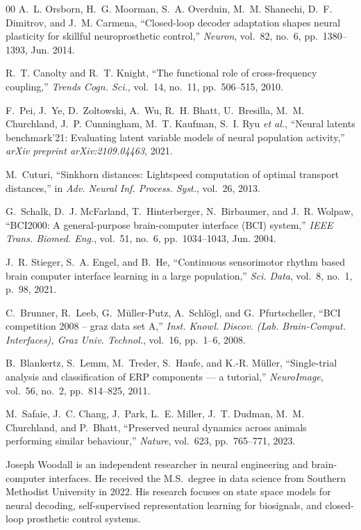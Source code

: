 \documentclass[journal]{IEEEtran}
\begin{document}
\begin{thebibliography}{00}
A.~L. Orsborn, H.~G. Moorman, S.~A. Overduin, M.~M. Shanechi, D.~F. Dimitrov, and J.~M. Carmena, ``Closed-loop decoder adaptation shapes neural plasticity for skillful neuroprosthetic control,'' \emph{Neuron}, vol.~82, no.~6, pp.~1380--1393, Jun. 2014.

R.~T. Canolty and R.~T. Knight, ``The functional role of cross-frequency coupling,'' \emph{Trends Cogn. Sci.}, vol.~14, no.~11, pp.~506--515, 2010.

F.~Pei, J.~Ye, D.~Zoltowski, A.~Wu, R.~H. Bhatt, U.~Bresilla, M.~M. Churchland, J.~P. Cunningham, M.~T. Kaufman, S.~I. Ryu \emph{et al.}, ``Neural latents benchmark'21: Evaluating latent variable models of neural population activity,'' \emph{arXiv preprint arXiv:2109.04463}, 2021.

M.~Cuturi, ``Sinkhorn distances: Lightspeed computation of optimal transport distances,'' in \emph{Adv. Neural Inf. Process. Syst.}, vol.~26, 2013.

G.~Schalk, D.~J. McFarland, T.~Hinterberger, N.~Birbaumer, and J.~R. Wolpaw, ``{BCI2000}: A general-purpose brain-computer interface ({BCI}) system,'' \emph{IEEE Trans. Biomed. Eng.}, vol.~51, no.~6, pp.~1034--1043, Jun. 2004.

J.~R. Stieger, S.~A. Engel, and B.~He, ``Continuous sensorimotor rhythm based brain computer interface learning in a large population,'' \emph{Sci. Data}, vol.~8, no.~1, p.~98, 2021.

C.~Brunner, R.~Leeb, G.~M\"{u}ller-Putz, A.~Schl\"{o}gl, and G.~Pfurtscheller, ``{BCI} competition 2008 -- graz data set {A},'' \emph{Inst. Knowl. Discov. (Lab. Brain-Comput. Interfaces), Graz Univ. Technol.}, vol.~16, pp.~1--6, 2008.

B.~Blankertz, S.~Lemm, M.~Treder, S.~Haufe, and K.-R. M\"{u}ller, ``Single-trial analysis and classification of {ERP} components --- a tutorial,'' \emph{NeuroImage}, vol.~56, no.~2, pp.~814--825, 2011.

M.~Safaie, J.~C. Chang, J.~Park, L.~E. Miller, J.~T. Dudman, M.~M. Churchland, and P.~Bhatt, ``Preserved neural dynamics across animals performing similar behaviour,'' \emph{Nature}, vol.~623, pp.~765--771, 2023.

\end{thebibliography}

\begin{IEEEbiographynophoto}{Joseph Woodall}
is an independent researcher in neural engineering and brain-computer
interfaces. He received the M.S.\ degree in data science from Southern Methodist University in 2022.
His research focuses on state space models for neural decoding, self-supervised
representation learning for biosignals, and closed-loop prosthetic control
systems.
\end{IEEEbiographynophoto}
\end{document}
